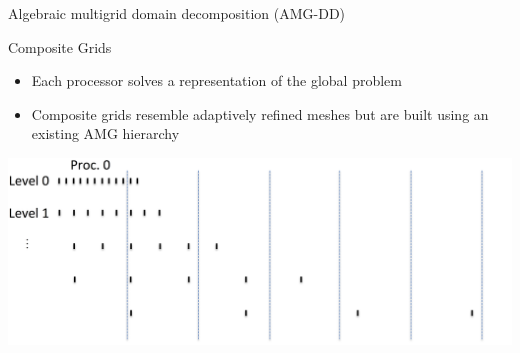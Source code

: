 \documentclass[18pt,xcolor=table]{beamer}
\begin{document}
\begin{frame}{Algebraic multigrid domain decomposition (AMG-DD)}
\begin{block}{Composite Grids}
\begin{itemize}
\item Each processor solves a representation of the global problem
\item Composite grids resemble adaptively refined meshes but are built using an existing AMG hierarchy
\end{itemize}
\end{block}
\centering
\includegraphics[width=\textwidth]{../figures/compGridCreation1D13}
\end{frame}
\end{document}
